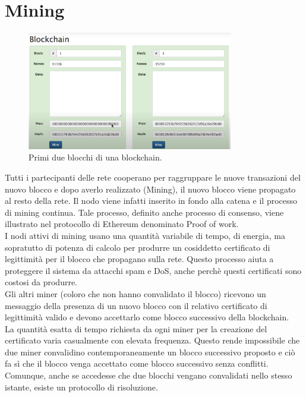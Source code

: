\documentclass[a4paper,11pt]{report}
\begin{document}
\section{Mining}
\begin{figure}[htbp] 
\begin{center}
\includegraphics[width=9cm]{img/mm.png} 
\end{center}
\caption{Primi due blocchi di una blockchain. \cite{mine}}
\end{figure} 
Tutti i partecipanti delle rete cooperano per raggruppare le nuove transazioni del nuovo blocco e dopo averlo realizzato (Mining), il nuovo blocco viene propagato al resto della rete. Il nodo viene infatti inserito in fondo alla catena e il processo di mining continua. Tale processo, definito anche processo di consenso, viene illustrato nel protocollo di Ethereum denominato Proof of work.\\
I nodi attivi di mining usano una quantità variabile di tempo, di energia, ma sopratutto di potenza di calcolo per produrre un cosiddetto certificato di legittimità per il blocco che propagano sulla rete. Questo processo aiuta a proteggere il sistema da attacchi spam e DoS, anche perchè questi certificati sono costosi da produrre.\\
Gli altri miner (coloro che non hanno convalidato il blocco) ricevono un messaggio della presenza di un nuovo blocco con il relativo certificato di legittimità valido e devono accettarlo come blocco successivo della blockchain.\\
La quantità esatta di tempo richiesta da ogni miner per la creazione del certificato varia casualmente con elevata frequenza. Questo rende impossibile che due miner convalidino contemporaneamente un blocco successivo proposto e ciò fa sì che il blocco venga accettato come blocco successivo senza conflitti. Comunque, anche se accedesse che due blocchi vengano convalidati nello stesso istante, esiste un protocollo di risoluzione.
\end{document}

